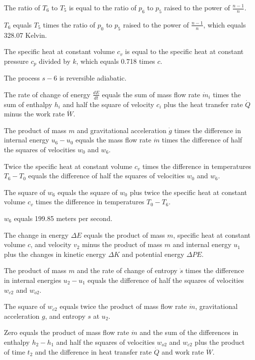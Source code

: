 The ratio of \( T_6 \) to \( T_5 \) is equal to the ratio of \( p_6 \) to \( p_5 \) raised to the power of \( \frac{n-1}{n} \).

\( T_6 \) equals \( T_5 \) times the ratio of \( p_0 \) to \( p_5 \) raised to the power of \( \frac{n-1}{n} \), which equals 328.07 Kelvin.

The specific heat at constant volume \( c_v \) is equal to the specific heat at constant pressure \( c_p \) divided by \( k \), which equals 0.718 times \( c \).

The process \( s-6 \) is reversible adiabatic.

The rate of change of energy \( \frac{dE}{dt} \) equals the sum of mass flow rate \( \dot{m}_i \) times the sum of enthalpy \( h_i \) and half the square of velocity \( c_i \) plus the heat transfer rate \( \dot{Q} \) minus the work rate \( \dot{W} \).

The product of mass \( m \) and gravitational acceleration \( \dot{g} \) times the difference in internal energy \( u_6 - u_0 \) equals the mass flow rate \( \dot{m} \) times the difference of half the squares of velocities \( w_0 \) and \( w_6 \).

Twice the specific heat at constant volume \( c_v \) times the difference in temperatures \( T_6 - T_0 \) equals the difference of half the squares of velocities \( w_0 \) and \( w_6 \).

The square of \( w_6 \) equals the square of \( w_0 \) plus twice the specific heat at constant volume \( c_v \) times the difference in temperatures \( T_0 - T_6 \).

\( w_6 \) equals 199.85 meters per second.

The change in energy \( \Delta E \) equals the product of mass \( m \), specific heat at constant volume \( c \), and velocity \( v_2 \) minus the product of mass \( m \) and internal energy \( u_1 \) plus the changes in kinetic energy \( \Delta K \) and potential energy \( \Delta P E \).

The product of mass \( m \) and the rate of change of entropy \( \dot{s} \) times the difference in internal energies \( u_2 - u_1 \) equals the difference of half the squares of velocities \( w_{c2} \) and \( w_{o2} \).

The square of \( w_{c2} \) equals twice the product of mass flow rate \( \dot{m} \), gravitational acceleration \( g \), and entropy \( s \) at \( u_2 \).

Zero equals the product of mass flow rate \( \dot{m} \) and the sum of the differences in enthalpy \( h_2 - h_1 \) and half the squares of velocities \( w_{o2} \) and \( w_{c2} \) plus the product of time \( t_2 \) and the difference in heat transfer rate \( \dot{Q} \) and work rate \( \dot{W} \).

